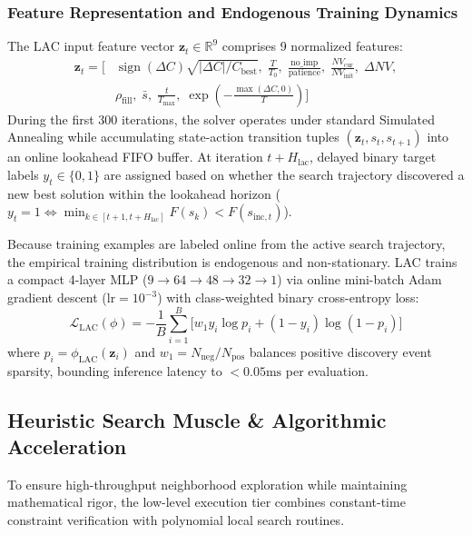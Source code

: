 \documentclass{ieeeaccess}
\begin{document}
\subsubsection{Feature Representation and Endogenous Training Dynamics}
The LAC input feature vector $\mathbf{z}_t \in \mathbb{R}^9$ comprises 9 normalized features:
\begin{align}
  \mathbf{z}_t = \Big[ 
    &\operatorname{sign}(\Delta C)\sqrt{|\Delta C| / C_{\text{best}}}, \; \frac{T}{T_0}, \; \frac{\text{no\_imp}}{\text{patience}}, \; \frac{NV_{\text{cur}}}{NV_{\text{init}}}, \; \Delta NV, \nonumber \\
    &\rho_{\text{fill}}, \; \bar{s}, \; \frac{t}{T_{\max}}, \; \exp\left(-\frac{\max(\Delta C, 0)}{T}\right) \Big]
  \label{eq:lac_features}
\end{align}
During the first 300 iterations, the solver operates under standard Simulated Annealing while accumulating state-action transition tuples $( \mathbf{z}_t, s_t, s_{t+1} )$ into an online lookahead FIFO buffer. At iteration $t + H_{\text{lac}}$, delayed binary target labels $y_t \in \{0, 1\}$ are assigned based on whether the search trajectory discovered a new best solution within the lookahead horizon ($y_t = 1 \iff \min_{k \in [t+1, t+H_{\text{lac}}]} F(s_k) < F(s_{\text{inc}, t})$).

Because training examples are labeled online from the active search trajectory, the empirical training distribution is endogenous and non-stationary. LAC trains a compact 4-layer MLP ($9 \to 64 \to 48 \to 32 \to 1$) via online mini-batch Adam gradient descent ($\text{lr} = 10^{-3}$) with class-weighted binary cross-entropy loss:
\begin{equation}
  \mathcal{L}_{\text{LAC}}(\phi) = -\frac{1}{B} \sum_{i=1}^B \Big[ w_1 y_i \log p_i + (1 - y_i) \log (1 - p_i) \Big]
  \label{eq:lac_loss}
\end{equation}
where $p_i = \phi_{\text{LAC}}(\mathbf{z}_i)$ and $w_1 = N_{\text{neg}} / N_{\text{pos}}$ balances positive discovery event sparsity, bounding inference latency to $< 0.05\text{ms}$ per evaluation.

\subsection{Heuristic Search Muscle \& Algorithmic Acceleration}
\label{sec:search_muscle}

To ensure high-throughput neighborhood exploration while maintaining mathematical rigor, the low-level execution tier combines constant-time constraint verification with polynomial local search routines.
\end{document}
